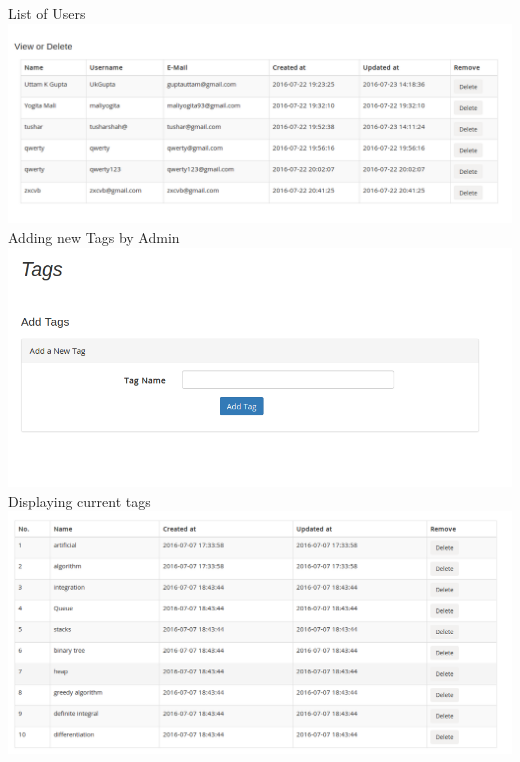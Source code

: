 \documentclass[a4paper,12pt,oneside]{book}
\begin{document}
\newpage \vspace{0.7in}
List of Users \\
\includegraphics[scale=0.35]{user2.png}	\\

\vspace{1in}
Adding new Tags by Admin\\
\includegraphics[scale=0.45]{tags.png}	\\

\vspace{2in}
Displaying current tags \\
\includegraphics[scale=0.3]{tags2.png}	\\
\end{document}
